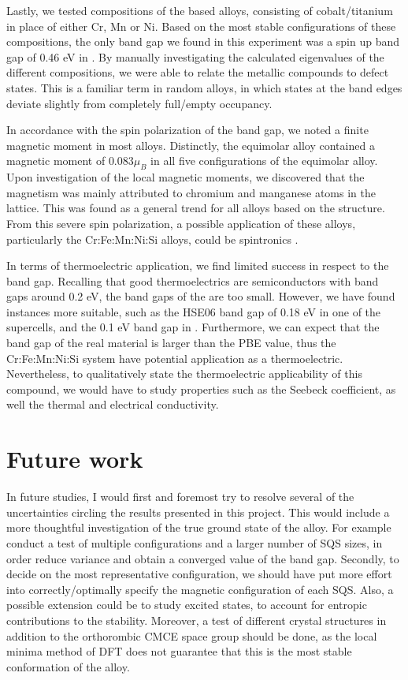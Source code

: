 \documentclass[UKenglish]{ifimaster}  %
\begin{document}
Lastly, we tested compositions of the  based alloys, consisting of cobalt/titanium in place of either Cr, Mn or Ni. Based on the most stable configurations of these compositions, the only band gap we found in this experiment was a spin up band gap of 0.46 eV in . By manually investigating the calculated eigenvalues of the different compositions, we were able to relate the metallic compounds to defect states. This is a familiar term in random alloys, in which states at the band edges deviate slightly from completely full/empty occupancy.  

In accordance with the spin polarization of the band gap, we noted a finite magnetic moment in most alloys.  Distinctly, the equimolar alloy contained a magnetic moment of $0.083 \mu_B$ in all five configurations of the equimolar alloy. Upon investigation of the local magnetic moments, we discovered that the magnetism was mainly attributed to chromium and manganese atoms in the lattice. This was found as a general trend for all alloys based on the  structure. From this severe spin polarization, a possible application of these alloys, particularly the Cr:Fe:Mn:Ni:Si alloys, could be spintronics \cite{spintronic}. 

In terms of thermoelectric application, we find limited success in respect to the band gap. Recalling that good thermoelectrics are semiconductors with band gaps around 0.2 eV, the band gaps of the  are too small. However, we have found instances more suitable, such as the HSE06 band gap of 0.18 eV in one of the supercells, and the 0.1 eV band gap in . Furthermore, we can expect that the band gap of the real material is larger than the PBE value, thus   the Cr:Fe:Mn:Ni:Si system have potential application as a thermoelectric. Nevertheless, to qualitatively state the thermoelectric applicability of this compound, we would have to study properties such as the Seebeck coefficient, as well the thermal and electrical conductivity.

\chapter{Future work}

In future studies, I would first and foremost try to resolve several of the uncertainties circling the results presented in this project. This would include a more thoughtful investigation of the true ground state of the  alloy. For example conduct a test of multiple configurations and a larger number of SQS sizes, in order reduce variance and obtain a converged value of the band gap. Secondly, to decide on the most representative configuration, we should have put more effort into correctly/optimally specify the magnetic configuration of each SQS. Also, a possible extension could be to study excited states, to account for entropic contributions to the stability.  Moreover, a test of different crystal structures in addition to the orthorombic CMCE space group should be done, as the local minima method of DFT does not guarantee that this is the most stable conformation of the alloy.
\end{document}

